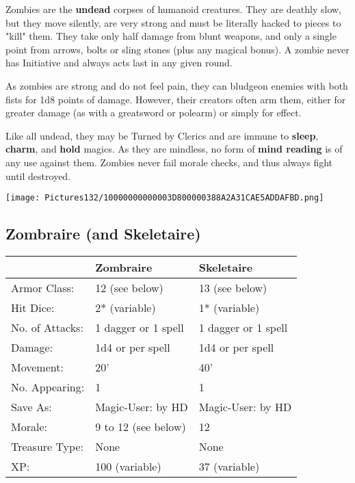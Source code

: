 \documentclass[a4paper,twoside,openany,10pt]{book}
\begin{document}
\begin{multicols}{2}
Zombies are the \textbf{undead} corpses of humanoid creatures. They are deathly slow, but they move silently, are very strong and must be literally hacked to pieces to "kill" them. They take only half damage from blunt weapons, and only a single point from arrows, bolts or sling stones (plus any magical bonus). A zombie never has Initiative and always acts last in any given round.

As zombies are strong and do not feel pain, they can bludgeon enemies with both fists for 1d8 points of damage. However, their creators often arm them, either for greater damage (as with a greatsword or polearm) or simply for effect.

Like all undead, they may be Turned by Clerics and are immune to \textbf{sleep}, \textbf{charm},\textbf{ }and \textbf{hold} magics. As they are mindless, no form of \textbf{mind reading} is of any use against them. Zombies never fail morale checks, and thus always fight until destroyed.

\begin{center} \texttt{[image: Pictures132/10000000000003D800000388A2A31CAE5ADDAFBD.png]} \end{center}

\subsection*{Zombraire (and Skeletaire)}\label{zombraire-and-skeletaire}

\begin{tabularx}{0.50\textwidth}{@{}lXX@{}}
& Zombraire & Skeletaire \\\hline
Armor Class: & 12 (see below) & 13 (see below) \\\hline
Hit Dice: & 2* (variable) & 1* (variable) \\\hline
No. of Attacks: & 1 dagger or 1 spell & 1 dagger or 1 spell \\\hline
Damage: & 1d4 or per spell & 1d4 or per spell \\\hline
Movement: & 20' & 40' \\\hline
No. Appearing: & 1 & 1 \\\hline
Save As: & Magic-User: by HD & Magic-User: by HD \\\hline
Morale: & 9 to 12 (see below) & 12 \\\hline
Treasure Type: & None & None \\\hline
XP: & 100 (variable) & 37 (variable) \\\hline
\end{tabularx}\medskip


\end{multicols}
\end{document}
